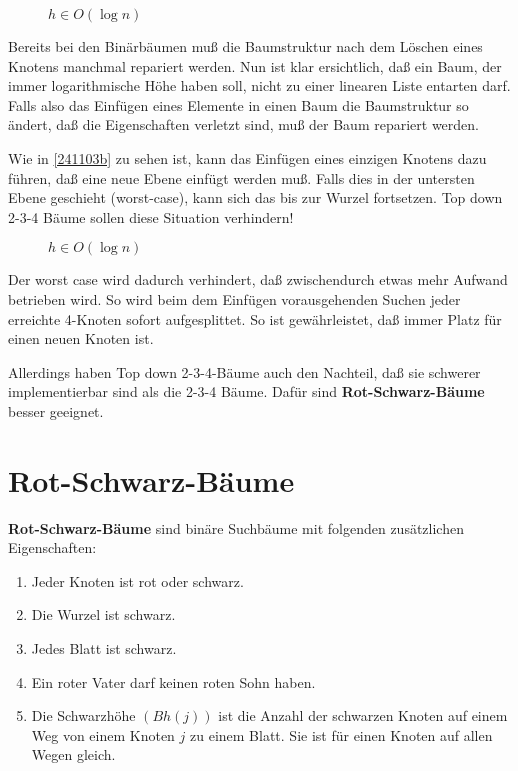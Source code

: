 \begin{figure}[H]
    \centering
    \caption{$h \in O(\log n)$}
    \label{241103a}
 \end{figure}	

Bereits bei den Binärbäumen muß die Baumstruktur nach dem Löschen eines Knotens manchmal repariert werden.
Nun ist klar ersichtlich, daß ein Baum, der immer logarithmische Höhe haben soll, nicht zu einer linearen Liste entarten darf. 	
Falls also das Einfügen eines Elemente in einen Baum die Baumstruktur so ändert, daß die Eigenschaften 
verletzt sind, muß der Baum repariert werden.

Wie in \autoref{241103b} zu sehen ist, kann das Einfügen eines einzigen Knotens dazu führen, daß eine neue Ebene
einfügt werden muß. Falls dies in der untersten Ebene geschieht (worst-case), kann sich das bis zur Wurzel fortsetzen.	
Top down 2-3-4 Bäume sollen diese Situation verhindern! 
 
 \begin{figure}[H]
    \centering
    \caption{$h \in O(\log n)$}
    \label{241103b}
 \end{figure}

Der worst case wird dadurch verhindert, daß zwischendurch etwas mehr Aufwand betrieben wird.
So wird beim dem Einfügen vorausgehenden Suchen jeder erreichte 4-Knoten sofort aufgesplittet.
So ist gewährleistet, daß immer Platz für einen neuen Knoten ist.

Allerdings haben Top down 2-3-4-Bäume auch den Nachteil, daß sie schwerer implementierbar sind als die 2-3-4 Bäume. 
    Dafür sind \textbf{Rot-Schwarz-Bäume} besser geeignet. %

\section{Rot-Schwarz-Bäume}
 
\begin{definition}
   \textbf{Rot-Schwarz-Bäume} sind binäre Suchbäume mit folgenden zusätzlichen Eigenschaften:
      \begin{enumerate}
	          \item Jeder Knoten ist rot oder schwarz.
	          \item Die Wurzel ist schwarz.
	          \item Jedes Blatt ist schwarz.
	          \item Ein roter Vater darf keinen roten Sohn haben.
	          \item Die Schwarzhöhe $(Bh(j))$ ist die Anzahl der schwarzen Knoten auf einem Weg von einem Knoten $j$ zu einem
		  Blatt. Sie ist für einen Knoten auf allen Wegen gleich.
      \end{enumerate}
\end{definition}

